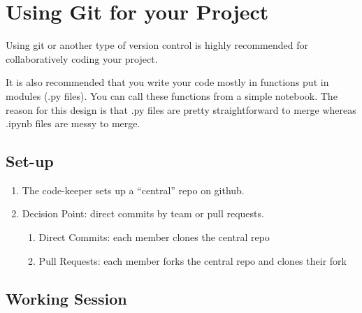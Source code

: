 \documentclass[11pt]{article}
\begin{document}
\section*{Using Git for your Project}

Using git or another type of version control is highly recommended for collaboratively coding your project.

It is also recommended that you write your code mostly in functions put in modules (.py files).  You can call these functions from a simple notebook.  The reason for this design is that .py files are pretty straightforward to merge whereas .ipynb files are messy to merge.

\subsection*{Set-up}

\begin{enumerate}
\item The code-keeper sets up a ``central'' repo on github.
\item Decision Point: direct commits by team or pull requests.
\begin{enumerate}
\item Direct Commits: each member clones the central repo
\item Pull Requests: each member forks the central repo and clones their fork
\end{enumerate}
\end{enumerate}

\subsection*{Working Session}
\end{document}
